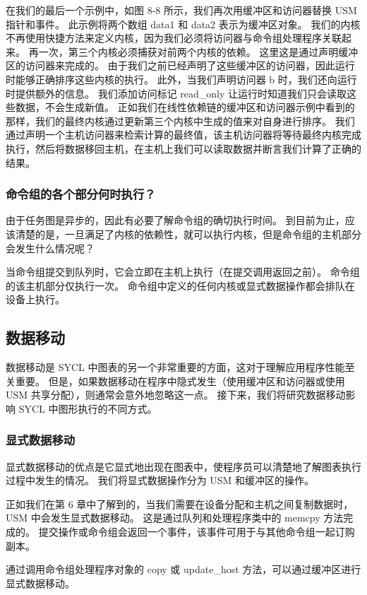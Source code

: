 在我们的最后一个示例中，如图 8-8 所示，我们再次用缓冲区和访问器替换 USM 指针和事件。 此示例将两个数组 data1 和 data2 表示为缓冲区对象。 我们的内核不再使用快捷方法来定义内核，因为我们必须将访问器与命令组处理程序关联起来。 再一次，第三个内核必须捕获对前两个内核的依赖。 这里这是通过声明缓冲区的访问器来完成的。 由于我们之前已经声明了这些缓冲区的访问器，因此运行时能够正确排序这些内核的执行。 此外，当我们声明访问器 b 时，我们还向运行时提供额外的信息。 我们添加访问标记 read\_only 让运行时知道我们只会读取这些数据，不会生成新值。 正如我们在线性依赖链的缓冲区和访问器示例中看到的那样，我们的最终内核通过更新第三个内核中生成的值来对自身进行排序。 我们通过声明一个主机访问器来检索计算的最终值，该主机访问器将等待最终内核完成执行，然后将数据移回主机，在主机上我们可以读取数据并断言我们计算了正确的结果。

\subsubsection{命令组的各个部分何时执行？}
由于任务图是异步的，因此有必要了解命令组的确切执行时间。 到目前为止，应该清楚的是，一旦满足了内核的依赖性，就可以执行内核，但是命令组的主机部分会发生什么情况呢？

当命令组提交到队列时，它会立即在主机上执行（在提交调用返回之前）。 命令组的该主机部分仅执行一次。 命令组中定义的任何内核或显式数据操作都会排队在设备上执行。

\subsection{数据移动}
数据移动是 SYCL 中图表的另一个非常重要的方面，这对于理解应用程序性能至关重要。 但是，如果数据移动在程序中隐式发生（使用缓冲区和访问器或使用 USM 共享分配），则通常会意外地忽略这一点。 接下来，我们将研究数据移动影响 SYCL 中图形执行的不同方式。

\subsubsection{显式数据移动}
显式数据移动的优点是它显式地出现在图表中，使程序员可以清楚地了解图表执行过程中发生的情况。 我们将显式数据操作分为 USM 和缓冲区的操作。

正如我们在第 6 章中了解到的，当我们需要在设备分配和主机之间复制数据时，USM 中会发生显式数据移动。 这是通过队列和处理程序类中的 memcpy 方法完成的。 提交操作或命令组会返回一个事件，该事件可用于与其他命令组一起订购副本。

通过调用命令组处理程序对象的 copy 或 update\_host 方法，可以通过缓冲区进行显式数据移动。

